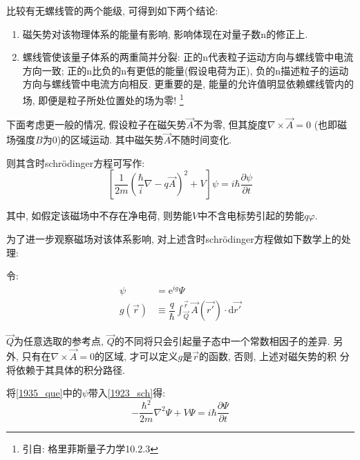 \documentclass[a4paper, 11pt]{article}
\begin{document}
\begin{spacing}{1.2}
        比较有无螺线管的两个能级, 可得到如下两个结论:
        \begin{enumerate}[*]
          \item 磁矢势对该物理体系的能量有影响, 影响体现在对量子数n的修正上.
          \item 螺线管使该量子体系的两重简并分裂: 正的n代表粒子运动方向与螺线管中电流方向一致;
                正的n比负的n有更低的能量(假设电荷为正), 负的n描述粒子的运动方向与螺线管中电流方向相反.
                更重要的是, 能量的允许值明显依赖螺线管内的场, 即便是粒子所处位置处的场为零!
                \footnote{引自: 格里菲斯量子力学10.2.3}
        \end{enumerate}

        下面考虑更一般的情况, 假设粒子在磁矢势$\vec{A}$不为零, 但其旋度$\nabla\times\vec{A} = 0$
        (也即磁场强度$B$为0)的区域运动. 其中磁矢势$\vec{A}$不随时间变化. 

        则其含时schr\"odinger方程可写作:
        \begin{equation}
          \label{1923_sch}
          \left[\dfrac{1}{2m}\left(\dfrac{\hbar}{i}\nabla-q\vec{A}\right)^2 + V\right]\psi%
          = i\hbar\dfrac{\partial\psi}{\partial{}t}
        \end{equation}

        其中, 如假定该磁场中不存在净电荷, 则势能$V$中不含电标势引起的势能$q\varphi$.

        为了进一步观察磁场对该体系影响, 对上述含时schr\"odinger方程做如下数学上的处理:

        令:
        \begin{equation}
          \label{1935_que}
          \begin{aligned}
            \psi &= \mathrm{e}^{ig}\Psi\\
            g(\vec{r}) &\equiv \dfrac{q}{\hbar}\int_{\vec{Q}}^{\vec{r}}\vec{A}(\vec{r'})%
                \cdot\mathrm{d}\vec{r'}
          \end{aligned}  
        \end{equation}

        $\vec{Q}$为任意选取的参考点, $\vec{Q}$的不同将只会引起量子态中一个常数相因子的差异. 另外, 
        只有在$\nabla\times\vec{A} = 0$的区域, 才可以定义$g$是$\vec{r}$的函数, 否则, 上述对磁矢势的积
        分将依赖于其具体的积分路径.

        将\eqref{1935_que}中的$\psi$带入\eqref{1923_sch}得:
        \begin{equation}
          -\dfrac{\hbar^2}{2m}\nabla^2\Psi + V\Psi = i\hbar\dfrac{\partial\Psi}{\partial{}t}          
        \end{equation}
        

\end{spacing}
\end{document}
